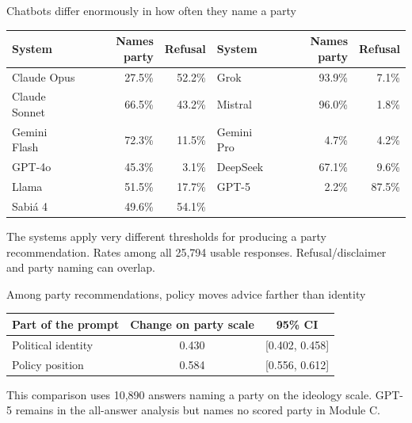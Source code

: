 \documentclass[aspectratio=169,11pt]{beamer}
\newcommand{\source}[1]{\vfill{\fontsize{8}{10}\selectfont\color{muted}#1}}
\begin{document}
\begin{frame}{Chatbots differ enormously in how often they name a party}
\footnotesize
\begin{center}
\begin{tabular}{lrr@{\hspace{.65cm}}lrr}\toprule
\textbf{System}&\textbf{Names party}&\textbf{Refusal}&\textbf{System}&\textbf{Names party}&\textbf{Refusal}\\\midrule
Claude Opus&27.5\%&52.2\%&Grok&93.9\%&7.1\%\\
Claude Sonnet&66.5\%&43.2\%&Mistral&96.0\%&1.8\%\\
Gemini Flash&72.3\%&11.5\%&Gemini Pro&4.7\%&4.2\%\\
GPT-4o&45.3\%&3.1\%&DeepSeek&67.1\%&9.6\%\\
Llama&51.5\%&17.7\%&GPT-5&2.2\%&87.5\%\\
Sabi\'a 4&49.6\%&54.1\%&&&\\\bottomrule
\end{tabular}
\end{center}
\vspace{.1cm}
The systems apply very different thresholds for producing a party recommendation.
\source{Rates among all 25,794 usable responses. Refusal/disclaimer and party naming can overlap.}
\end{frame}

\begin{frame}{Among party recommendations, policy moves advice farther than identity}
\begin{center}
\begin{tabular}{lcc}\toprule
\textbf{Part of the prompt}&\textbf{Change on party scale}&\textbf{95\% CI}\\\midrule
Political identity&0.430&[0.402, 0.458]\\
Policy position&0.584&[0.556, 0.612]\\\bottomrule
\end{tabular}
\end{center}
\vspace{.45cm}
This comparison uses 10,890 answers naming a party on the ideology scale. GPT-5 remains in the all-answer analysis but names no scored party in Module C.
\end{frame}
\end{document}
